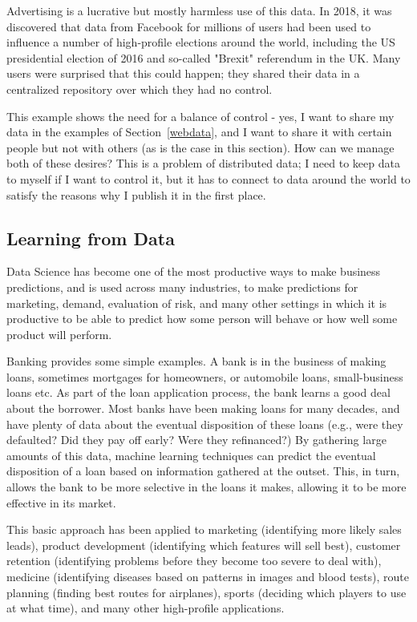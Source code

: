 Advertising is a lucrative but mostly harmless use of this data.  In 2018, it 
was discovered that data from Facebook for millions of users had been used 
to influence a number of high-profile elections around the world, including the 
US presidential election of 2016 and so-called "Brexit" referendum in the
UK\cite{cambridge2018}.  Many
users were surprised that this could happen; they shared their data in a centralized
repository over which they had no control.  

This example shows the need for a balance of control - yes, I want to share my
data in the examples of Section~\ref{webdata}, and I want to share it with 
certain people but not with others (as is the case in this section). How can
we manage both of these desires?  This is a problem of distributed data; I need
to keep data to myself if I want to control it, but it has to connect to data
around the world to satisfy the reasons why I publish it in the first place. 


\subsection{Learning from Data}

Data Science has become one of the most productive ways to make business predictions,
and is used across many industries, to make predictions for marketing, demand, 
evaluation of risk, and many other settings in which it is productive to be 
able to predict how some person will behave or how well some product will perform. 

Banking provides some simple examples.  A bank is in the business of making loans, 
sometimes mortgages for homeowners, or automobile loans, small-business loans etc. 
As part of the loan application process, the bank learns a good deal about the 
borrower.  Most banks have been making loans for many decades, and have plenty of data
about the eventual disposition of these loans (e.g., were they defaulted?  Did they pay off 
early?  Were they refinanced?) By gathering large amounts of this data, machine learning techniques can 
predict the eventual disposition of a loan based on information gathered at the outset. 
This, in turn, allows the bank to be more selective in the loans it makes, allowing it 
to be more effective in its market. 

This basic approach has been applied to marketing (identifying more likely sales leads), product development
(identifying which features will sell best), customer retention (identifying problems before 
they become too severe to deal with), medicine (identifying diseases based on patterns in 
images and blood tests), route planning (finding best routes for airplanes), sports (deciding which 
players to use at what time), and many other high-profile applications. 

